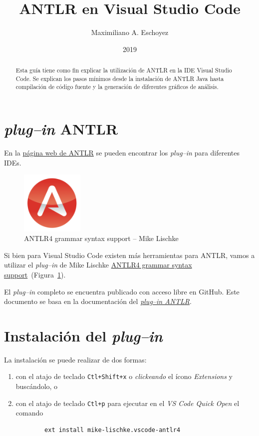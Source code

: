 \documentclass[a5paper,10pt]{article}
\author{Maximiliano A. Eschoyez}
\title{ANTLR en Visual Studio Code}
\date{2019}
\begin{document}
\maketitle

\begin{abstract}
	Esta guía tiene como fin explicar la utilización de ANTLR en la IDE Visual Studio Code.  Se explican los pasos mínimos desde la instalación de ANTLR Java hasta compilación de código fuente y la generación de diferentes gráficos de análisis.
\end{abstract}

\section{\emph{plug--in} ANTLR}
\label{intro}

En la \href{https://www.antlr.org/tools.html}{página web de ANTLR} se pueden encontrar los \emph{plug--in} para diferentes IDEs.

\begin{figure}[b]
	\centering
	\includegraphics[width=3cm]{IconoANTLRvscode}
	\caption{ANTLR4 grammar syntax support -- Mike Lischke}
	\label{icono}
\end{figure}

Si bien para Visual Studio Code existen más herramientas para ANTLR, vamos a utilizar el \emph{plug--in} de Mike Lischke \href{https://marketplace.visualstudio.com/items?itemName=mike-lischke.vscode-antlr4}{ANTLR4 grammar syntax support}~(Figura~\ref{icono}).

El \emph{plug--in} completo se encuentra publicado con acceso libre en GitHub.  Este documento se basa en la documentación del \href{https://github.com/mike-lischke/vscode-antlr4/tree/master/doc}{\emph{plug--in ANTLR}}.



\section{Instalación del \emph{plug--in}}
\label{instalacion}

La instalación se puede realizar de dos formas:
\begin{enumerate}
	\item con el atajo de teclado \verb|Ctl+Shift+x| o \emph{clickeando} el ícono \emph{Extensions} y buscándolo, o
    \item con el atajo de teclado \verb|Ctl+p| para ejecutar en el \emph{VS Code Quick Open} el comando
    \begin{verbatim}
		ext install mike-lischke.vscode-antlr4
	\end{verbatim}
\end{enumerate}
\end{document}
